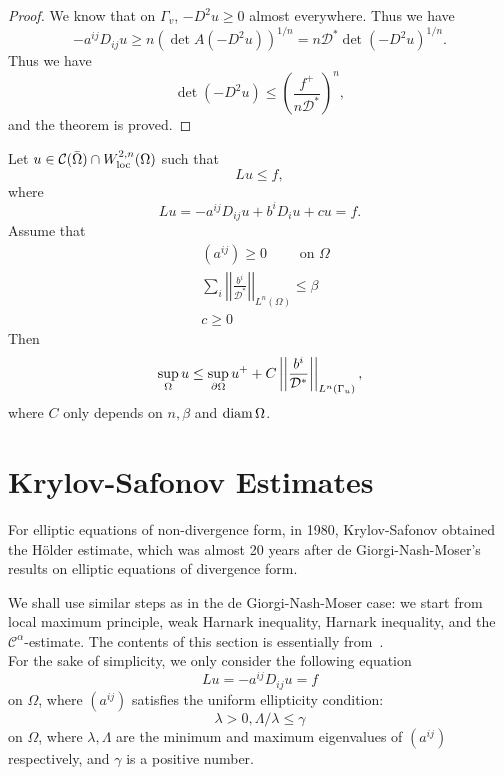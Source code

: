 \begin{proof} We know that on $\Gamma_v$, $-D^2 u\geq 0$ almost everywhere. Thus we have
\[
-a^{ij}D_{ij} u\geq n(\det A(-D^2u))^{1/n}=n\mathcal D^*\det (-D^2 u)^{1/n}.
\]
Thus we have
\[
\det(-D^2 u)\leq\left(\frac{f^+}{n\mathcal D^*}\right)^n,
\]
and the theorem is proved.

\end{proof}

\begin{theorem} Let $u\in \mathcal C(\bar\Omega)\cap W_{{\rm loc}}^{2,n}(\Omega)$ 
such that
\[
Lu\leq f,
\]
where
\[
Lu=-a^{ij}D_{ij} u+b^i D_i u+cu=f.
\]
Assume that 
\begin{align*}
& (a^{ij})\geq 0\qquad \text{ on } \Omega\\
&\sum_i\left|\left|\frac{b^i}{\mathcal D^*}\right|\right|_{L^n(\Omega)}\leq\beta\\
& c\geq 0
\end{align*}
Then
\[
\sup_\Omega u\leq\sup_{\partial\Omega} u^++C\left|\left|\frac{b^i}{\mathcal D^*}\right|\right|_{L^n(\Gamma_u)},
\]
where $C$ only depends on $n,\beta$ and ${\rm diam}\,\Omega$.
\end{theorem}



\section{Krylov-Safonov Estimates}\label{Krylov-Safonov}
For elliptic equations of non-divergence form, in 1980, Krylov-Safonov obtained the H\"older estimate, which was almost 20 years after de Giorgi-Nash-Moser's results on elliptic equations of divergence form.

We shall use similar steps as in the de Giorgi-Nash-Moser case: we start from local maximum principle, weak Harnark inequality,  Harnark inequality, and the $\mathcal C^\alpha$-estimate. The contents of this section is essentially from~\cite{chen}.\\

For the sake of simplicity, we only consider  the following equation
\begin{equation}\label{div-2}
Lu=-a^{ij} D_{ij} u=f
\end{equation}
on $\Omega$, where $(a^{ij})$ satisfies the uniform ellipticity condition:
\begin{equation}\label{uni-4}
\lambda>0, \Lambda/\lambda\leq\gamma
\end{equation}
on $\Omega$, where $\lambda, \Lambda$ are the minimum and maximum eigenvalues of $(a^{ij})$
respectively, and $\gamma$ is a positive number.

